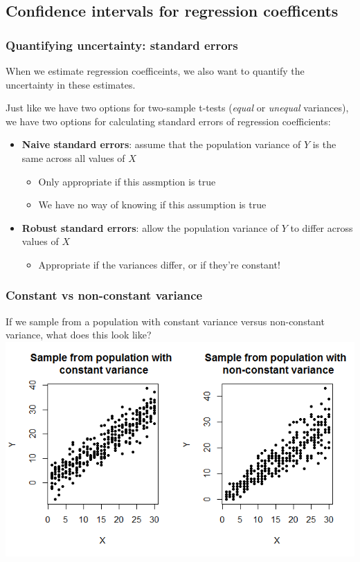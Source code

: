 \documentclass[12pt, 
hyperref={colorlinks=true, linkcolor=blue, urlcolor=cyan}]{beamer}
\begin{document}
\subsection{Confidence intervals for regression coefficents}
\begin{frame}
\frametitle{Quantifying uncertainty: standard errors}

When we estimate regression coefficeints, we also want to quantify the \color{blue} uncertainty \color{black} in these estimates.\vspace{-0.2cm} \pause

Just like we have two options for two-sample t-tests (\textit{equal} or \textit{unequal} variances), we have \color{blue} two options for calculating standard errors of regression coefficients\color{black}: \vspace{-0.3cm} \pause
\begin{itemize}
\item \textbf{Naive standard errors}: assume that the population variance of $Y$ is the same across all values of $X$ %
	\begin{itemize}
	\item Only appropriate if this assmption is true
	\item We have no way of knowing if this assumption is true
	\end{itemize}
\item \textbf{Robust standard errors}: allow the population variance of $Y$ to differ across values of $X$ %
	\begin{itemize}
	\item Appropriate if the variances differ, or if they're constant!
	\end{itemize}
\end{itemize}
\end{frame}

\begin{frame}
\frametitle{Constant vs non-constant variance}

If we sample from a population with constant variance versus non-constant variance, what does this look like?
\includegraphics[width=\textwidth]{./plots/hetero}

\end{frame}
\end{document}
